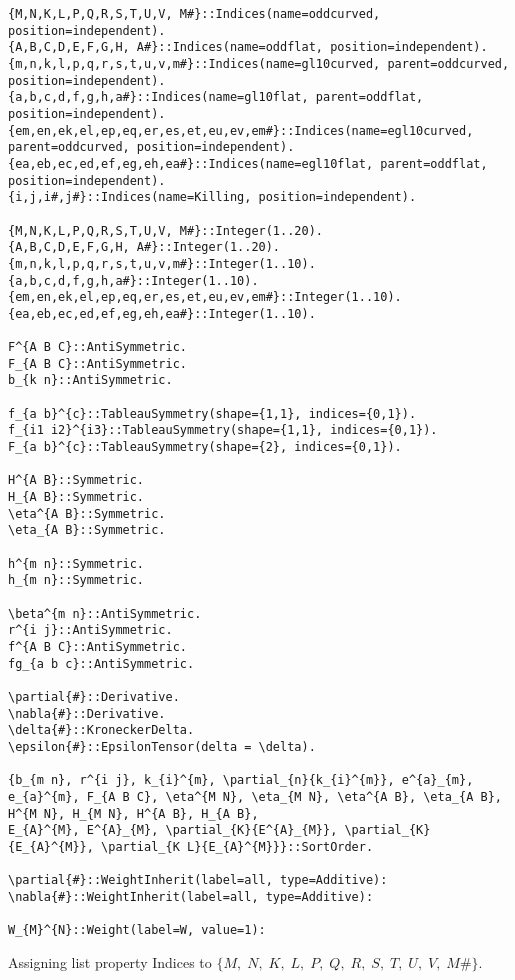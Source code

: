 \documentclass[11pt]{article}
\begin{document}
{\color[named]{Blue}\begin{verbatim}
{M,N,K,L,P,Q,R,S,T,U,V, M#}::Indices(name=oddcurved, position=independent).
{A,B,C,D,E,F,G,H, A#}::Indices(name=oddflat, position=independent).
{m,n,k,l,p,q,r,s,t,u,v,m#}::Indices(name=gl10curved, parent=oddcurved, position=independent).
{a,b,c,d,f,g,h,a#}::Indices(name=gl10flat, parent=oddflat, position=independent).
{em,en,ek,el,ep,eq,er,es,et,eu,ev,em#}::Indices(name=egl10curved, parent=oddcurved, position=independent).
{ea,eb,ec,ed,ef,eg,eh,ea#}::Indices(name=egl10flat, parent=oddflat, position=independent).
{i,j,i#,j#}::Indices(name=Killing, position=independent).

{M,N,K,L,P,Q,R,S,T,U,V, M#}::Integer(1..20).
{A,B,C,D,E,F,G,H, A#}::Integer(1..20).
{m,n,k,l,p,q,r,s,t,u,v,m#}::Integer(1..10).
{a,b,c,d,f,g,h,a#}::Integer(1..10).
{em,en,ek,el,ep,eq,er,es,et,eu,ev,em#}::Integer(1..10).
{ea,eb,ec,ed,ef,eg,eh,ea#}::Integer(1..10).

F^{A B C}::AntiSymmetric.
F_{A B C}::AntiSymmetric.
b_{k n}::AntiSymmetric.

f_{a b}^{c}::TableauSymmetry(shape={1,1}, indices={0,1}).
f_{i1 i2}^{i3}::TableauSymmetry(shape={1,1}, indices={0,1}).
F_{a b}^{c}::TableauSymmetry(shape={2}, indices={0,1}).

H^{A B}::Symmetric.
H_{A B}::Symmetric.
\eta^{A B}::Symmetric.
\eta_{A B}::Symmetric.

h^{m n}::Symmetric.
h_{m n}::Symmetric.

\beta^{m n}::AntiSymmetric.
r^{i j}::AntiSymmetric.
f^{A B C}::AntiSymmetric.
fg_{a b c}::AntiSymmetric.

\partial{#}::Derivative.
\nabla{#}::Derivative.
\delta{#}::KroneckerDelta.
\epsilon{#}::EpsilonTensor(delta = \delta).

{b_{m n}, r^{i j}, k_{i}^{m}, \partial_{n}{k_{i}^{m}}, e^{a}_{m}, e_{a}^{m}, F_{A B C}, \eta^{M N}, \eta_{M N}, \eta^{A B}, \eta_{A B}, H^{M N}, H_{M N}, H^{A B}, H_{A B},
E_{A}^{M}, E^{A}_{M}, \partial_{K}{E^{A}_{M}}, \partial_{K}{E_{A}^{M}}, \partial_{K L}{E_{A}^{M}}}::SortOrder.

\partial{#}::WeightInherit(label=all, type=Additive):
\nabla{#}::WeightInherit(label=all, type=Additive):

W_{M}^{N}::Weight(label=W, value=1):
\end{verbatim}}
Assigning list property Indices to $\{M,\; N,\; K,\; L,\; P,\; Q,\; R,\; S,\; T,\; U,\; V,\; M\#\}$.
\\
\end{document}
